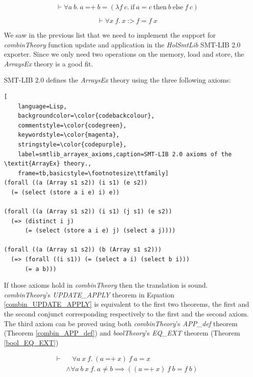 \documentclass{kththesis}
\begin{document}
\begin{equation}
    \vdash \forall a~b.~a~\text{=+}~b = (\lambda f~c.~\text{if}~a = c~\text{then}~b~\text{else}~f~c)
    \label{combin_UPDATE_def}
\end{equation}

\begin{equation}
    \vdash \forall x~f.~x~\text{:>}~f = f~x
    \label{combin_APP_def}
\end{equation}

We saw in the previous list that we need to implement the support for \textit{combinTheory} function update and application in the \textit{HolSmtLib} SMT-LIB 2.0 exporter. Since we only need two operations on the memory, load and store, the \textit{ArraysEx} theory is a good fit.

SMT-LIB 2.0 \cite{smtlib} defines the \textit{ArraysEx} theory using the three following axioms:

\begin{lstlisting}[
    language=Lisp,
    backgroundcolor=\color{codebackcolour},
    commentstyle=\color{codegreen},
    keywordstyle=\color{magenta},
    stringstyle=\color{codepurple},
    label=smtlib_arrayex_axioms,caption=SMT-LIB 2.0 axioms of the \textit{ArrayEx} theory.,
    frame=tb,basicstyle=\footnotesize\ttfamily]
(forall ((a (Array s1 s2)) (i s1) (e s2))
  (= (select (store a i e) i) e)) 

(forall ((a (Array s1 s2)) (i s1) (j s1) (e s2))
  (=> (distinct i j)
      (= (select (store a i e) j) (select a j))))

(forall ((a (Array s1 s2)) (b (Array s1 s2)))
  (=> (forall ((i s1)) (= (select a i) (select b i)))
      (= a b)))
\end{lstlisting}

If those axioms hold in \textit{combinTheory} then the translation is sound. \textit{combinTheory}'s \textit{UPDATE\_APPLY} theorem in Equation \ref{combin_UPDATE_APPLY} is equivalent to the first two theorems, the first and the second conjunct corresponding respectively to the first and the second axiom. The third axiom can be proved using both \textit{combinTheory}'s \textit{APP\_def} theorem (Theorem \ref{combin_APP_def}) and \textit{boolTheory}'s \textit{EQ\_EXT} theorem (Theorem \ref{bool_EQ_EXT})

\begin{equation}
    \begin{split}
        \vdash &  ~~~~ \forall a~x~f.~(a~\text{=+}~x)~f~a = x\\
               & \land \forall a~b~x~f.~a \neq b \implies ((a~\text{=+}~x)~f~b = f~b)
    \end{split}
    \label{combin_UPDATE_APPLY}
\end{equation}
\end{document}
